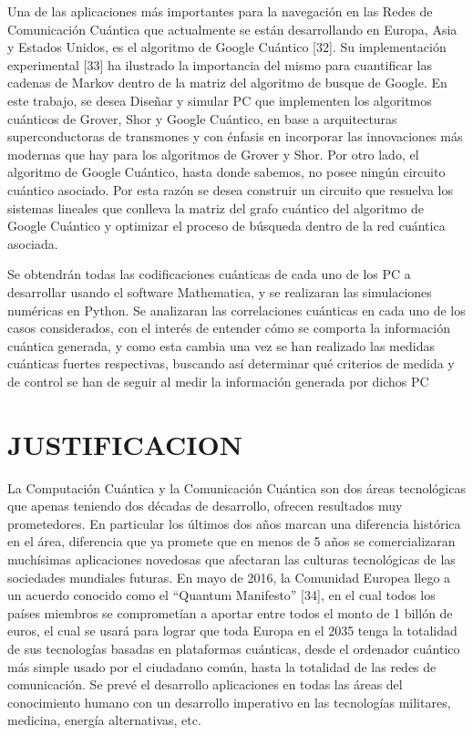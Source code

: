 Una de las aplicaciones más importantes para la navegación en las Redes de Comunicación Cuántica que actualmente se están desarrollando en Europa, Asia y Estados Unidos, es el algoritmo de Google Cuántico [32]. Su implementación experimental [33] ha ilustrado la importancia del mismo para cuantificar las cadenas de Markov dentro de la matriz del algoritmo de busque de Google. En este trabajo, se desea Diseñar y simular PC que implementen los algoritmos cuánticos de Grover, Shor y Google Cuántico, en base a arquitecturas superconductoras de transmones y con énfasis en incorporar las innovaciones más modernas que hay para los algoritmos de Grover y Shor.  Por otro lado, el algoritmo de Google Cuántico, hasta donde sabemos, no posee ningún circuito cuántico asociado. Por esta razón se desea construir un circuito que resuelva los sistemas lineales que conlleva la matriz del grafo cuántico del algoritmo de Google Cuántico y optimizar el proceso de búsqueda dentro de la red cuántica asociada.

Se obtendrán todas las codificaciones cuánticas de cada uno de los PC a desarrollar usando el software Mathematica, y se realizaran las simulaciones numéricas en Python. Se analizaran las correlaciones cuánticas en cada uno de los casos considerados, con el interés de entender cómo se comporta la información cuántica generada, y como esta cambia una vez se han realizado las medidas cuánticas fuertes respectivas, buscando así determinar qué criterios de medida y de control se han de seguir al medir la información generada por dichos PC 

\section{JUSTIFICACION}

La Computación Cuántica y la Comunicación Cuántica son dos áreas tecnológicas que apenas teniendo dos décadas de desarrollo, ofrecen resultados muy prometedores. En particular los últimos dos años marcan una diferencia histórica en el área, diferencia que ya promete que en menos de 5 años se comercializaran muchísimas aplicaciones novedosas que afectaran las culturas tecnológicas de las sociedades mundiales futuras. En mayo de 2016, la Comunidad Europea llego a un acuerdo conocido como el “Quantum Manifesto” [34], en el cual todos los países miembros se comprometían a aportar entre todos el monto de 1 billón de euros, el cual se usará para lograr que toda Europa en el 2035 tenga la totalidad de sus tecnologías basadas en plataformas cuánticas, desde el ordenador cuántico más simple usado por el ciudadano común, hasta la totalidad de las redes de comunicación. Se prevé el desarrollo aplicaciones en todas las áreas del conocimiento humano con un desarrollo imperativo en las tecnologías militares, medicina, energía alternativas, etc.

